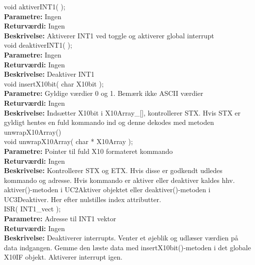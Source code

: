 void aktiverINT1( ); \\
\textbf{Parametre:} Ingen \\
\textbf{Returværdi:} Ingen \\
\textbf{Beskrivelse:} Aktiverer INT1 ved toggle og aktiverer global interrupt \\

void deaktiverINT1( ); \\
\textbf{Parametre:} Ingen \\
\textbf{Returværdi:} Ingen \\
\textbf{Beskrivelse:} Deaktiver INT1 \\

void insertX10bit( char X10bit ); \\
\textbf{Parametre:} Gyldige værdier 0 og 1. Bemærk ikke ASCII værdier \\
\textbf{Returværdi:} Ingen \\
\textbf{Beskrivelse:} Indsætter X10bit i X10Array\_[], kontrollerer STX. Hvis STX er gyldigt hentes en fuld kommando ind og denne dekodes med metoden unwrapX10Array() \\

void unwrapX10Array( char * X10Array ); \\
\textbf{Parametre:} Pointer til fuld X10 formateret kommando \\
\textbf{Returværdi:} Ingen \\
\textbf{Beskrivelse:} Kontrollerer STX og ETX. Hvis disse er godkendt udledes kommando og adresse. Hvis kommando er aktiver eller deaktiver kaldes hhv. aktiver()-metoden i UC2Aktiver objektet eller deaktiver()-metoden i UC3Deaktiver. Her efter nulstilles index attributter. \\

ISR( INT1\_vect ); \\
\textbf{Parametre:} Adresse til INT1 vektor \\
\textbf{Returværdi:} Ingen \\
\textbf{Beskrivelse:} Deaktiverer interrupts. Venter et øjeblik og udlæser værdien på data indgangen. Gemme den læste data med insertX10bit()-metoden i det globale X10IF objekt. Aktiverer interrupt igen. \\

